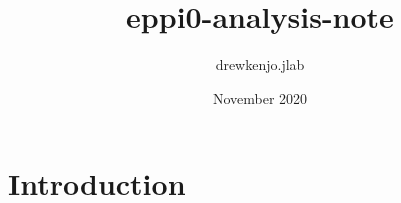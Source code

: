 \documentclass{article}
\title{eppi0-analysis-note}
\author{drewkenjo.jlab }
\date{November 2020}
\begin{document}
\maketitle

\section{Introduction}
\end{document}
